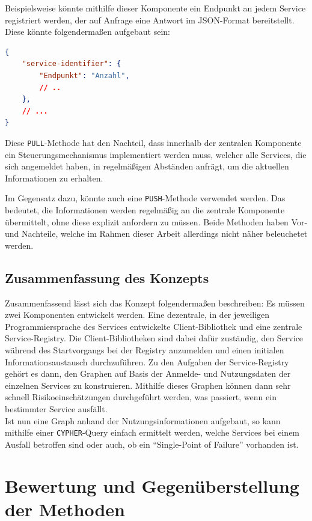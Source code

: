 Beispielsweise könnte mithilfe dieser Komponente ein Endpunkt an jedem Service registriert werden, der auf Anfrage eine Antwort im JSON-Format bereitstellt. Diese könnte folgendermaßen aufgebaut sein:

\begin{lstlisting}[language=json, caption={Antwort über Nutzung anderer Services}]
{
	"service-identifier": {
		"Endpunkt": "Anzahl",
		// ..
	},
	// ...
}
\end{lstlisting}

Diese \texttt{PULL}-Methode hat den Nachteil, dass innerhalb der zentralen Komponente ein Steuerungsmechanismus implementiert werden muss, welcher alle Services, die sich angemeldet haben, in regelmäßigen Abständen anfrägt, um die aktuellen Informationen zu erhalten.

Im Gegensatz dazu, könnte auch eine \texttt{PUSH}-Methode verwendet werden. Das bedeutet, die Informationen werden regelmäßig an die zentrale Komponente übermittelt, ohne diese explizit anfordern zu müssen. Beide Methoden haben Vor- und Nachteile, welche im Rahmen dieser Arbeit allerdings nicht näher beleuchetet werden.

\subsection{Zusammenfassung des Konzepts}

Zusammenfassend lässt sich das Konzept folgendermaßen beschreiben: Es müssen zwei Komponenten entwickelt werden. Eine dezentrale, in der jeweiligen Programmiersprache des Services entwickelte Client-Bibliothek und eine zentrale Service-Registry. Die Client-Bibliotheken sind dabei dafür zuständig, den Service während des Startvorgangs bei der Registry anzumelden und einen initialen Informationsaustausch durchzuführen. Zu den Aufgaben der Service-Registry gehört es dann, den Graphen auf Basis der Anmelde- und Nutzungsdaten der einzelnen Services zu konstruieren. Mithilfe dieses Graphen können dann sehr schnell Risikoeinschätzungen durchgeführt werden, was passiert, wenn ein bestimmter Service ausfällt. \\
Ist nun eine Graph anhand der Nutzungsinformationen aufgebaut, so kann mithilfe einer \texttt{CYPHER}-Query einfach ermittelt werden, welche Services bei einem Ausfall betroffen sind oder auch, ob ein \enquote{Single-Point of Failure} vorhanden ist.

\section{Bewertung und Gegenüberstellung der Methoden}

